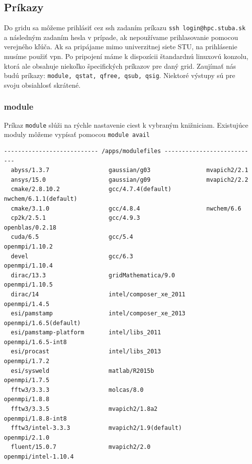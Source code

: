 \subsection{Príkazy}
Do gridu sa môžeme prihlásiť cez \acrshort{ssh} zadaním príkazu \texttt{ssh login@hpc.stuba.sk} a následným zadaním hesla v prípade,
ak nepoužívame prihlasovanie pomocou verejného kľúča.
Ak sa pripájame mimo univerzitnej siete STU, na prihlásenie musíme použiť \acrshort{vpn}.
Po pripojení máme k dispozícii štandardnú linuxovú konzolu, ktorá ale obsahuje niekoľko špecifických príkazov pre daný grid.
Zaujímať nás budú príkazy: \texttt{module, qstat, qfree, qsub, qsig}.
Niektoré výstupy sú pre svoju obsiahlosť skrátené.

\subsubsection{module}
\label{kap:module}
Príkaz \texttt{module} slúži na rýchle nastavenie ciest k vybraným knižniciam. Existujúce moduly môžeme vypísať pomocou \texttt{module avail}

\begin{lstlisting}[caption={module avail}]
  --------------------------- /apps/modulefiles ---------------------------
  abyss/1.3.7                 gaussian/g03                mvapich2/2.1
  ansys/15.0                  gaussian/g09                mvapich2/2.2
  cmake/2.8.10.2              gcc/4.7.4(default)          nwchem/6.1.1(default)
  cmake/3.1.0                 gcc/4.8.4                   nwchem/6.6
  cp2k/2.5.1                  gcc/4.9.3                   openblas/0.2.18
  cuda/6.5                    gcc/5.4                     openmpi/1.10.2
  devel                       gcc/6.3                     openmpi/1.10.4
  dirac/13.3                  gridMathematica/9.0         openmpi/1.10.5
  dirac/14                    intel/composer_xe_2011      openmpi/1.4.5
  esi/pamstamp                intel/composer_xe_2013      openmpi/1.6.5(default)
  esi/pamstamp-platform       intel/libs_2011             openmpi/1.6.5-int8
  esi/procast                 intel/libs_2013             openmpi/1.7.2
  esi/sysweld                 matlab/R2015b               openmpi/1.7.5
  fftw3/3.3.3                 molcas/8.0                  openmpi/1.8.8
  fftw3/3.3.5                 mvapich2/1.8a2              openmpi/1.8.8-int8
  fftw3/intel-3.3.3           mvapich2/1.9(default)       openmpi/2.1.0
  fluent/15.0.7               mvapich2/2.0                openmpi/intel-1.10.4
\end{lstlisting}

